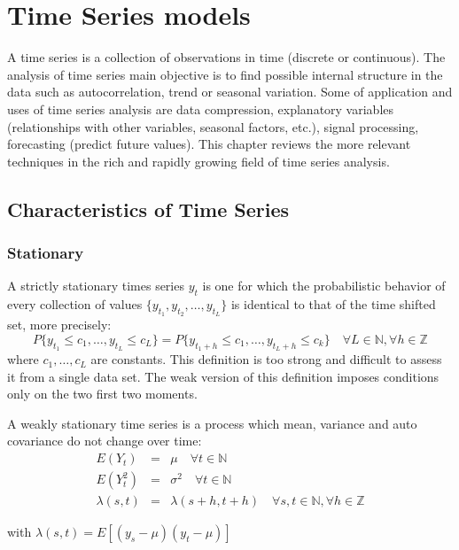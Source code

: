 
\chapter{Time Series models}

\vspace{0.5cm} 
 
A time series is a collection of observations in time (discrete or continuous).
The analysis of time series main objective is to find possible internal
structure in the data such as autocorrelation, trend or seasonal variation.
Some of application and uses of time series analysis are data compression,
explanatory variables (relationships with other variables, seasonal factors,
etc.), signal processing, forecasting (predict future values). This chapter
reviews the more relevant techniques in the rich and rapidly growing field of
time series analysis.

\section{Characteristics of Time Series}

\subsection{Stationary }
A strictly stationary times series $y_t$ is one for which the probabilistic behavior
of every collection of values $\{y_{t_1},y_{t_2},\dots,y_{t_L}\}$ is identical
to that of the time shifted set, more precisely: \[ P\{y_{t_1} \leq
c_1,\dots,y_{t_L} \leq c_L\} = P\{y_{t_1+h} \leq c_1,\dots,y_{t_L+h} \leq c_k\}
\quad \forall L \in \mathbb{N}, \forall h \in \mathbb{Z}\] \noindent where
$c_1,\dots,c_L$ are constants.  This definition is too strong and difficult to
assess it from a single data set. The weak version of this definition imposes
conditions only on the two first two moments.

A weakly stationary time series is a process which mean, variance and auto
covariance do not change over time: \begin{eqnarray*} E(Y_t) &=& \mu  \quad
\forall t \in \mathbb{N} \\ E(Y^2_t) &=& \sigma^2  \quad \forall t \in
\mathbb{N} \\ \lambda(s,t)&=&\lambda(s+h,t+h) \quad \forall s,t \in \mathbb{N},
\forall h \in \mathbb{Z} \end{eqnarray*}

\noindent with $\lambda(s,t) = E[(y_s-\mu)(y_t - \mu)]$ 

